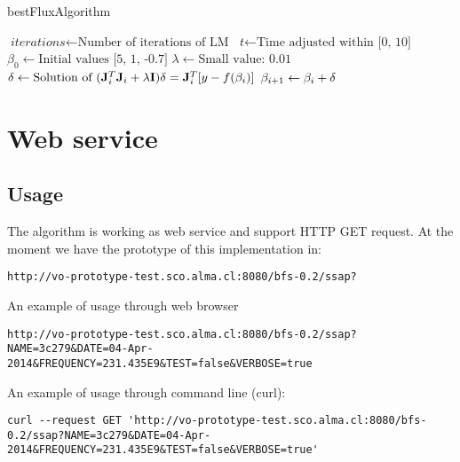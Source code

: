 \documentclass[10pt]{article}
\begin{document}
\begin{algorithm}
\caption{bestFluxAlgorithm}\label{4months}
\begin{algorithmic}[1]
\State $\textit{iterations} \gets \text{Number of iterations of LM}$
\Statex
\State $\textit{t} \gets \text{Time adjusted within [0, 10]}$
\Statex
\State $\textit{$\beta_0$} \gets \text{Initial values [5, 1, -0.7]}$
\Statex
\State $\textit{$\lambda$} \gets \text{Small value: 0.01}$
\Statex
{}
\Statex
\State $\textit{$\delta$} \gets \text{Solution of $ (\mathbf{J}_i^{T}\mathbf{J}_i + \lambda\mathbf{I})\delta = \mathbf{J}_i^{T}[y - f(\beta_i)] $}$
\Statex
\State $\textit{$\beta_{i+1}$} \gets \text{$ \beta_i + \delta $}$
\Statex
\EndFor
\State {}
\EndProcedure
\end{algorithmic}
\end{algorithm}

\section{Web service}
\subsection{Usage}
The algorithm is working as web service and support HTTP GET request. At the moment we have the
prototype of this implementation in:

\begingroup
\fontsize{8pt}{10pt}\selectfont
\begin{verbatim}
http://vo-prototype-test.sco.alma.cl:8080/bfs-0.2/ssap?
\end{verbatim}
\endgroup

\noindent An example of usage through web browser
\begingroup
\fontsize{6pt}{10pt}\selectfont
\begin{verbatim}
http://vo-prototype-test.sco.alma.cl:8080/bfs-0.2/ssap?NAME=3c279&DATE=04-Apr-2014&FREQUENCY=231.435E9&TEST=false&VERBOSE=true
\end{verbatim}
\endgroup

\noindent An example of usage through command line (curl):
\begingroup
\fontsize{6pt}{10pt}\selectfont
\begin{verbatim}
curl --request GET 'http://vo-prototype-test.sco.alma.cl:8080/bfs-0.2/ssap?NAME=3c279&DATE=04-Apr-2014&FREQUENCY=231.435E9&TEST=false&VERBOSE=true'
\end{verbatim}
\endgroup
\end{document}
